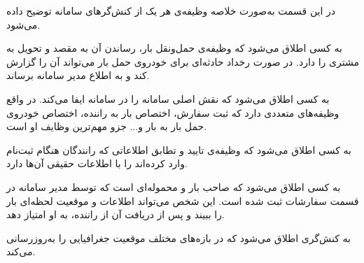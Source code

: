 در این قسمت به‌صورت خلاصه وظیفه‌ی هر یک از  کنش‌گرهای سامانه توضیح داده می‌شود.

 به کسی اطلاق می‌شود که وظیفه‌ی حمل‌ونقل بار، رساندن آن به مقصد و تحویل به مشتری را دارد. در صورت رخداد حادثه‌ای برای خودروی حمل بار می‌تواند آن را گزارش کند و به اطلاع مدیر سامانه برساند.

به کسی اطلاق می‌شود که نقش اصلی سامانه را در سامانه ایفا می‌کند. در واقع وظیفه‌های متعددی دارد که ثبت سفارش، اختصاص بار به راننده، اختصاص خودروی حمل بار به بار و... جزو مهم‌ترین وظایف او است.

به کسی اطلاق می‌شود که وظیفه‌ی تایید و تطابق اطلاعاتی که رانندگان هنگام ثبت‌نام وارد کرده‌اند را با اطلاعات حقیقی آن‌ها دارد.

به کسی اطلاق می‌شود که صاحب بار و محموله‌ای است که توسط مدیر سامانه در قسمت سفارشات ثبت شده است. این شخص می‌تواند اطلاعات و موقعیت لحظه‌ای بار را ببیند و پس از دریافت آن از راننده، به او امتیاز دهد.

 به کنش‌گری اطلاق می‌شود که در بازه‌های مختلف موقعیت جغرافیایی را به‌روزرسانی می‌کند.
